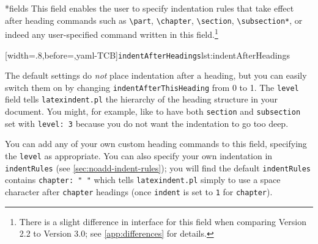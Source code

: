 *{fields}
 This field enables the user to specify indentation rules that take effect after heading
 commands such as \lstinline!\part!, \lstinline!\chapter!, \lstinline!\section!,
 \lstinline!\subsection*!, or indeed any user-specified command written in this
 field.\footnote{There is a slight difference in interface for this field when comparing
 Version 2.2 to Version 3.0; see \vref{app:differences} for details.}

 [width=.8\linewidth,before=\centering,yaml-TCB]{\texttt{indentAfterHeadings}}{lst:indentAfterHeadings}

 The default settings do \emph{not} place indentation after a heading, but you can easily
 switch them on by changing \texttt{indentAfterThisHeading} from 0 to 1. The
 \texttt{level} field tells \texttt{latexindent.pl} the hierarchy of the heading
 structure in your document. You might, for example, like to have both \texttt{section}
 and \texttt{subsection} set with \texttt{level: 3} because you do not want the
 indentation to go too deep.

 You can add any of your own custom heading commands to this field, specifying the
 \texttt{level} as appropriate. You can also specify your own indentation in
 \texttt{indentRules} (see \vref{sec:noadd-indent-rules}); you will find the default
 \texttt{indentRules} contains \lstinline!chapter: " "! which tells
 \texttt{latexindent.pl} simply to use a space character after \texttt{chapter} headings
 (once \texttt{indent} is set to \texttt{1} for \texttt{chapter}).

